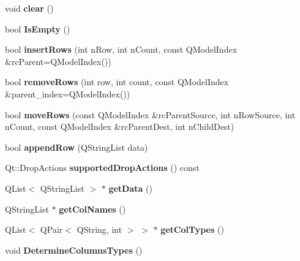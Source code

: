 \begin{DoxyCompactItemize}
\item 
\mbox{\label{class_custom_table_model_a571c48faa96af1afa9dc2d8dfb90d709}} 
void {\bfseries clear} ()
\item 
\mbox{\label{class_custom_table_model_a920879faea184930906ec569b5fcd185}} 
bool {\bfseries Is\+Empty} ()
\item 
\mbox{\label{class_custom_table_model_aa2a289578ed7fd2322a015e95dd5e0d3}} 
bool {\bfseries insert\+Rows} (int n\+Row, int n\+Count, const Q\+Model\+Index \&rc\+Parent=Q\+Model\+Index())
\item 
\mbox{\label{class_custom_table_model_ab046cc94b91bf01a13ae9e67d6163488}} 
bool {\bfseries remove\+Rows} (int row, int count, const Q\+Model\+Index \&parent\+\_\+index=Q\+Model\+Index())
\item 
\mbox{\label{class_custom_table_model_a8381f4bba13a26063ca8b2f474081e91}} 
bool {\bfseries move\+Rows} (const Q\+Model\+Index \&rc\+Parent\+Source, int n\+Row\+Source, int n\+Count, const Q\+Model\+Index \&rc\+Parent\+Dest, int n\+Child\+Dest)
\item 
\mbox{\label{class_custom_table_model_a684d28c48f5ef867640bb8b987fc8a72}} 
bool {\bfseries append\+Row} (Q\+String\+List data)
\item 
\mbox{\label{class_custom_table_model_ac842d36dd5b98e0419bf1c0f3e7a3da8}} 
Qt\+::\+Drop\+Actions {\bfseries supported\+Drop\+Actions} () const
\item 
\mbox{\label{class_custom_table_model_a440b90b538ecac68f84bfe2d81e84cd9}} 
Q\+List$<$ Q\+String\+List $>$ $\ast$ {\bfseries get\+Data} ()
\item 
\mbox{\label{class_custom_table_model_ab2e2187982786411f177d136b08446ad}} 
Q\+String\+List $\ast$ {\bfseries get\+Col\+Names} ()
\item 
\mbox{\label{class_custom_table_model_adc28a889c76fb54d97e18a135b5f9f86}} 
Q\+List$<$ Q\+Pair$<$ Q\+String, int $>$ $>$ $\ast$ {\bfseries get\+Col\+Types} ()
\item 
\mbox{\label{class_custom_table_model_a7583eb136e76f5e8d73dc69803106c56}} 
void {\bfseries Determine\+Columns\+Types} ()
\end{DoxyCompactItemize}
